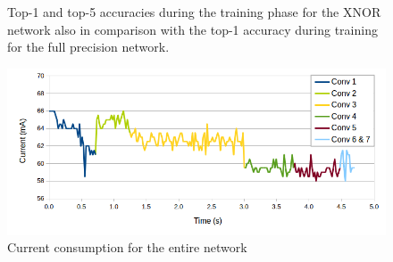 \documentclass[conference]{IEEEtran}
\begin{document}
\begin{figure}[!t]
\centering
{}
\hfill
{}
\caption{Top-1 and top-5 accuracies during the training phase for the XNOR network also in comparison with the top-1 accuracy during training for the full precision network.}
\label{fig:accuracy}
\end{figure}

\begin{figure}[!t]
\centering
\includegraphics[width=\textwidth]{data}
\caption{Current consumption for the entire network}
\label{fig:data}
\end{figure}
\end{document}
